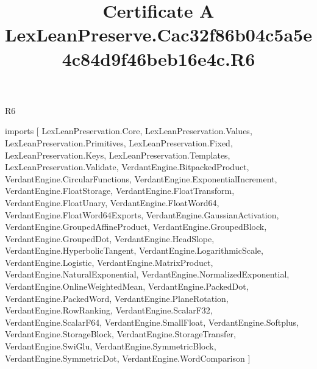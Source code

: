 \begin{lexlean}{R6}
\title{Certificate A LexLeanPreserve.Cac32f86b04c5a5e4c84d9f46beb16e4c.R6}
\begin{coremodule}
imports [
  LexLeanPreservation.Core,
  LexLeanPreservation.Values,
  LexLeanPreservation.Primitives,
  LexLeanPreservation.Fixed,
  LexLeanPreservation.Keys,
  LexLeanPreservation.Templates,
  LexLeanPreservation.Validate,
  VerdantEngine.BitpackedProduct,
  VerdantEngine.CircularFunctions,
  VerdantEngine.ExponentialIncrement,
  VerdantEngine.FloatStorage,
  VerdantEngine.FloatTransform,
  VerdantEngine.FloatUnary,
  VerdantEngine.FloatWord64,
  VerdantEngine.FloatWord64Exports,
  VerdantEngine.GaussianActivation,
  VerdantEngine.GroupedAffineProduct,
  VerdantEngine.GroupedBlock,
  VerdantEngine.GroupedDot,
  VerdantEngine.HeadSlope,
  VerdantEngine.HyperbolicTangent,
  VerdantEngine.LogarithmicScale,
  VerdantEngine.Logistic,
  VerdantEngine.MatrixProduct,
  VerdantEngine.NaturalExponential,
  VerdantEngine.NormalizedExponential,
  VerdantEngine.OnlineWeightedMean,
  VerdantEngine.PackedDot,
  VerdantEngine.PackedWord,
  VerdantEngine.PlaneRotation,
  VerdantEngine.RowRanking,
  VerdantEngine.ScalarF32,
  VerdantEngine.ScalarF64,
  VerdantEngine.SmallFloat,
  VerdantEngine.Softplus,
  VerdantEngine.StorageBlock,
  VerdantEngine.StorageTransfer,
  VerdantEngine.SwiGlu,
  VerdantEngine.SymmetricBlock,
  VerdantEngine.SymmetricDot,
  VerdantEngine.WordComparison
]


\end{coremodule}
\end{lexlean}
